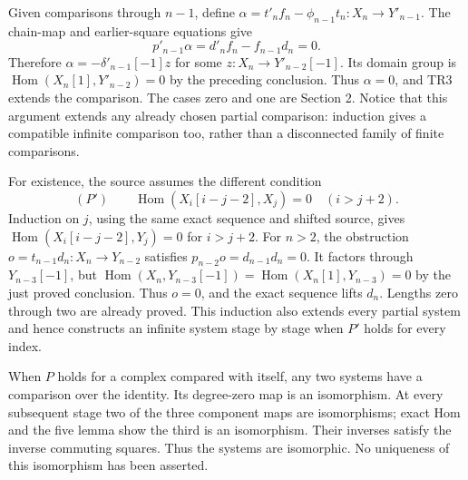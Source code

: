 \documentclass[11pt]{article}
\begin{document}
Given comparisons through \(n-1\),\allowbreak{} define \(\alpha=t'_nf_n-\phi_{n-1}t_n:X_n\to Y'_{n-1}\). The chain-map and earlier-square equations give \[
p'_{n-1}\alpha=d'_nf_n-f_{n-1}d_n=0.
\] Therefore \(\alpha=-\delta'_{n-1}[-1]z\) for some \(z:X_n\to Y'_{n-2}[-1]\). Its domain group is \(\operatorname{Hom}(X_n[1],Y'_{n-2})=0\) by the preceding conclusion. Thus \(\alpha=0\),\allowbreak{} and TR3 extends the comparison. The cases zero and one are Section 2. Notice that this argument extends any already chosen partial comparison:\allowbreak{} induction gives a compatible infinite comparison too,\allowbreak{} rather than a disconnected family of finite comparisons.

For existence,\allowbreak{} the source assumes the different condition \[
(P')\qquad \operatorname{Hom}(X_i[i-j-2],X_j)=0
 \quad(i>j+2).
\] Induction on \(j\),\allowbreak{} using the same exact sequence and shifted source,\allowbreak{} gives \(\operatorname{Hom}(X_i[i-j-2],Y_j)=0\) for \(i>j+2\). For \(n>2\),\allowbreak{} the obstruction \(o=t_{n-1}d_n:X_n\to Y_{n-2}\) satisfies \(p_{n-2}o=d_{n-1}d_n=0\). It factors through \(Y_{n-3}[-1]\),\allowbreak{} but \(\operatorname{Hom}(X_n,Y_{n-3}[-1])
 =\operatorname{Hom}(X_n[1],Y_{n-3})=0\) by the just proved conclusion. Thus \(o=0\),\allowbreak{} and the exact sequence lifts \(d_n\). Lengths zero through two are already proved. This induction also extends every partial system and hence constructs an infinite system stage by stage when \(P'\) holds for every index.

When \(P\) holds for a complex compared with itself,\allowbreak{} any two systems have a comparison over the identity. Its degree-zero map is an isomorphism. At every subsequent stage two of the three component maps are isomorphisms; exact Hom and the five lemma show the third is an isomorphism. Their inverses satisfy the inverse commuting squares. Thus the systems are isomorphic. No uniqueness of this isomorphism has been asserted.
\end{document}
